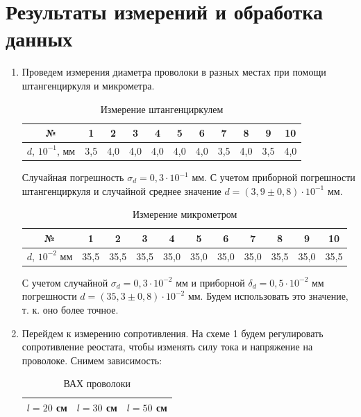 \documentclass[12pt]{article}
\begin{document}
    \section{Результаты измерений и обработка данных}
    \begin{enumerate}
        \item Проведем измерения диаметра проволоки в разных местах при
    помощи штангенциркуля и микрометра.
    \begin{table}[H]
        \caption{Измерение штангенциркулем}
        \begin{tabular}{|c|c|c|c|c|c|c|c|c|c|c|}
        \hline
        №                  & 1   & 2   & 3   & 4   & 5   & 6   & 7   & 8   & 9   & 10  \\ \hline
        $d$, $10^{-1}$, мм & 3,5 & 4,0 & 4,0 & 4,0 & 4,0 & 4,0 & 3,5 & 4,0 & 3,5 & 4,0 \\ \hline
        \end{tabular}
    \end{table}
    \par Случайная погрешность $\sigma_d = 0{,}3\cdot10^{-1}$ мм.
    С учетом приборной погрешности штангенциркуля и случайной среднее
    значение $d = (3{,}9\pm0{,}8)\cdot10^{-1}$ мм.
    \begin{table}[H]
        \caption{Измерение микрометром}
        \begin{tabular}{|c|c|c|c|c|c|c|c|c|c|c|}
        \hline
        №                 & 1    & 2    & 3    & 4    & 5    & 6    & 7    & 8    & 9    & 10   \\ \hline
        $d$, $10^{-2}$ мм & 35,5 & 35,5 & 35,5 & 35,0 & 35,0 & 35,0 & 35,0 & 35,5 & 35,0 & 35,5 \\ \hline
        \end{tabular}
    \end{table}
    С учетом случайной $\sigma_d = 0,3\cdot10^{-2}$ мм и приборной $\delta_d = 0,5\cdot10^{-2}$ мм 
     погрешности $d = (35{,}3\pm0{,}8)\cdot
    10^{-2}$ мм. Будем использовать это значение, т. к. оно более точное.
    \item Перейдем к измерению сопротивления. На схеме 1 будем регулировать
    сопротивление реостата, чтобы изменять силу тока и напряжение на
    проволоке. Снимем зависимость:
    \begin{table}[H]
        \caption{ВАХ проволоки}
        \begin{tabular}{|cc|cc|cc|}
        \hline
        \multicolumn{2}{|c|}{$l = 20$ см}       & \multicolumn{2}{c|}{$l = 30$ см}       & \multicolumn{2}{c|}{$l = 50$ см}       \\ \hline

\end{tabular}
\end{table}
\end{enumerate}
\end{document}
